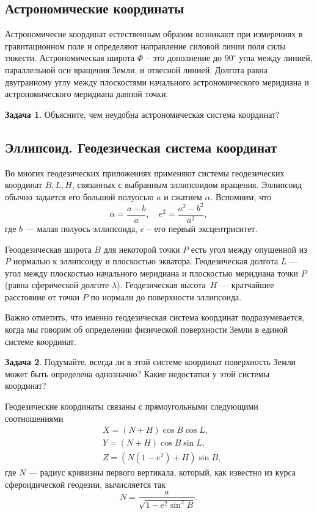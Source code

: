 \documentclass[11pt, a4paper]{article}
\theoremstyle{plain}
\theoremstyle{definition}
\newtheorem{problem}{Задача}[section]
\theoremstyle{remark}
\begin{document}
\subsection{Астрономические  координаты}
Астрономичесие координат естественным образом возникают при измерениях в гравитационном поле и
определяют направление силовой линии поля силы тяжести.
Астрономическая широта $\Phi$ -- это дополнение до $90^\circ$ угла между линией, параллельной оси
вращения Земли, и отвесной линией. Долгота равна двугранному углу между плоскостями начального
астрономического меридиана и астрономического меридиана данной точки.
\begin{problem}
    Объясните, чем неудобна астрономическая система координат?
\end{problem}

\subsection{Эллипсоид. Геодезическая система координат}
Во многих геодезических приложениях применяют системы геодезических координат $B, L, H$, 
связанных с выбранным
эллипсоидом вращения. Эллипсоид обычно задается его большой полуосью $a$ и сжатием $\alpha$.
Вспомним, что 
\begin{equation*}
    \alpha = \frac{a - b}{a},\quad e^2 = \frac{a^2 - b^2}{a^2},
\end{equation*}
где $b$ --- малая полуось эллипсоида, $e$ -- его первый эксцентриситет. 

Геоодезическая широта $B$ для некоторой точки $P$ есть угол между опущенной из $P$ нормалью к эллипсоиду и плоскостью
экватора. Геодезическая долгота $L$ --- угол между плоскостью начального меридиана и плоскостью
меридиана точки $P$ (равна сферической долготе $\lambda$). Геодезическая высота~$H$ --- кратчайшее
расстояние от точки $P$ по нормали до поверхности эллипсоида.

Важно отметить, что именно геодезическая система координат подразумевается, когда мы говорим
об определении физической поверхности Земли в единой системе координат. 
\begin{problem}
Подумайте, всегда ли в этой
системе координат поверхность Земли может быть определена однозначно? Какие недостатки у этой
системы координат?
\end{problem}

Геодезические координаты связаны с прямоугольными следующими соотношениями
\begin{align*}
    &X = \left( N + H \right)\cos{B}\cos{L},\\
    &Y = \left( N + H \right)\cos{B}\sin{L},\\
    &Z = \left( N (1 - e^2) + H \right)\sin{B},
\end{align*}
где $N$ --- радиус кривизны первого вертикала, который, как известно из курса сфероидической
геодезии, вычисляется так
\begin{equation*}
    N = \frac{a}{\sqrt{1 - e^2\sin^2{B}}}.
\end{equation*}
\end{document}
